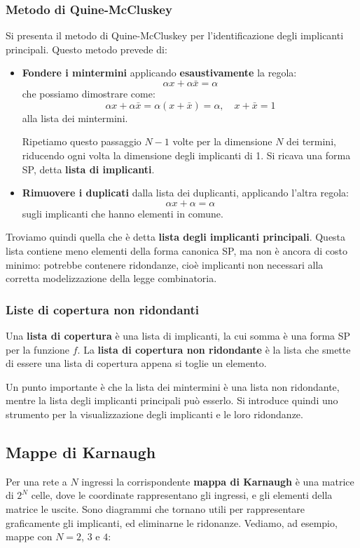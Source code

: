 \documentclass[a4paper,11pt]{article}
\begin{document}
\subsubsection{Metodo di Quine-McCluskey}
Si presenta il metodo di Quine-McCluskey per l'identificazione degli implicanti principali.
Questo metodo prevede di:
\begin{itemize}
	\item \textbf{Fondere i mintermini} applicando \textbf{esaustivamente} la regola:
$$
\alpha x + \alpha \bar{x} = \alpha
$$
che possiamo dimostrare come:
$$
\alpha x + \alpha \bar{x} = \alpha (x + \bar{x}) = \alpha, \quad x + \bar{x} = 1
$$
alla lista dei mintermini.

Ripetiamo questo passaggio $N - 1$ volte per la dimensione $N$ dei termini, riducendo ogni volta la dimensione degli implicanti di 1.
Si ricava una forma SP, detta \textbf{lista di implicanti}.
	\item \textbf{Rimuovere i duplicati} dalla lista dei duplicanti, applicando l'altra regola:
$$
\alpha x + \alpha = \alpha 
$$
sugli implicanti che hanno elementi in comune.
\end{itemize}

Troviamo quindi quella che è detta \textbf{lista degli implicanti principali}.
Questa lista contiene meno elementi della forma canonica SP, ma non è ancora di costo minimo: potrebbe contenere ridondanze, cioè implicanti non necessari alla corretta modelizzazione della legge combinatoria.

\subsubsection{Liste di copertura non ridondanti}
Una \textbf{lista di copertura} è una lista di implicanti, la cui somma è una forma SP per la funzione $f$.
La \textbf{lista di copertura non ridondante} è la lista che smette di essere una lista di copertura appena si toglie un elemento.

Un punto importante è che la lista dei mintermini è una lista non ridondante, mentre la lista degli implicanti principali può esserlo.
Si introduce quindi uno strumento per la visualizzazione degli implicanti e le loro ridondanze.

\subsection{Mappe di Karnaugh}
Per una rete a $N$ ingressi la corrispondente \textbf{mappa di Karnaugh} è una matrice di $2^N$ celle, dove le coordinate rappresentano gli ingressi, e gli elementi della matrice le uscite.
Sono diagrammi che tornano utili per rappresentare graficamente gli implicanti, ed eliminarne le ridonanze.
Vediamo, ad esempio, mappe con $N = 2$, $3$ e $4$:
\end{document}
